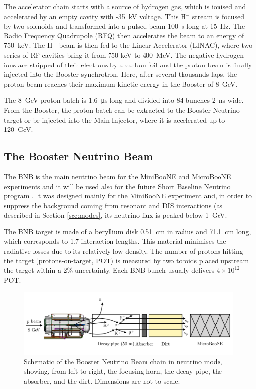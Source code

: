 The accelerator chain starts with a source of hydrogen gas, which is ionised and accelerated by an empty cavity with -35~kV voltage. This H$^-$ stream is focused by two solenoids and transformed into a pulsed beam 100~\si{\micro}s long at 15~Hz. The Radio Frequency Quadrupole (RFQ) then accelerates the beam to an energy of 750~keV. The H$^-$ beam is then fed to the Linear Accelerator (LINAC), where two series of RF cavities bring it from 750 keV to 400~MeV.  The negative hydrogen ions are stripped of their electrons by a carbon foil and the proton beam is finally injected into the Booster synchrotron. Here, after several thousands laps, the proton beam reaches their maximum kinetic energy in the Booster of 8~GeV.

The 8~GeV proton batch is 1.6~\si{\micro\second} long and divided into 84 bunches 2~ns wide. From the Booster, the proton batch can be extracted to the Booster Neutrino target or be injected into the Main Injector, where it is accelerated up to 120~GeV.

\subsection{The Booster Neutrino Beam}
The BNB is the main neutrino beam for the MiniBooNE and MicroBooNE experiments and it will be used also for the future Short Baseline Neutrino program \cite{Antonello:2015lea}. It was designed mainly for the MiniBooNE experiment and, in order to suppress the background coming from resonant and DIS interactions (as described in Section \ref{sec:modes}, its neutrino flux is peaked below 1~GeV.

The BNB target is made of a beryllium disk 0.51~cm in radius and 71.1~cm long, which corresponds to 1.7 interaction lengths. This material minimises the radiative losses due to its relatively low density. The number of protons hitting the target (protons-on-target, POT) is measured by two toroids placed upstream the target within a 2\% uncertainty. Each BNB bunch usually delivers $4\times10^{12}$ POT. 

\begin{figure}[htbp]
    \centering
    \includegraphics[width=0.98\linewidth]{figures/neutrinobeam.pdf}
    \caption{Schematic of the Booster Neutrino Beam chain in neutrino mode, showing, from left to right, the focusing horn, the decay pipe, the absorber, and the dirt. Dimensions are not to scale.}
    \label{fig:neutrinobeam}
\end{figure}

